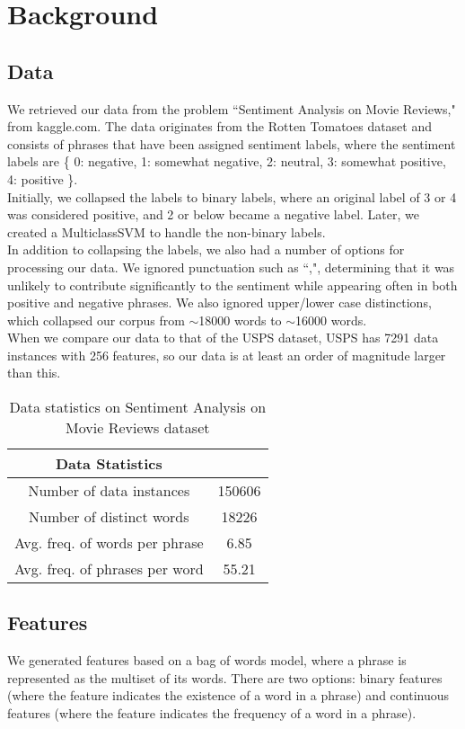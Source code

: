 \documentclass[letterpaper, 11pt]{article}
\begin{document}
\section{Background}

\subsection{Data}
We retrieved our data from the problem ``Sentiment Analysis on Movie Reviews," from kaggle.com.  The data originates from the Rotten Tomatoes dataset and consists of phrases that have been assigned sentiment labels, where the sentiment labels are \{ 0: negative, 1: somewhat negative, 2: neutral, 3: somewhat positive, 4: positive \}.\\
\indent Initially, we collapsed the labels to binary labels, where an original label of 3 or 4 was considered positive, and 2 or below became a negative label.  Later, we created a MulticlassSVM to handle the non-binary labels.  \\
\indent In addition to collapsing the labels, we also had a number of options for processing our data.  We ignored punctuation such as  ``,", determining that it was unlikely to contribute significantly to the sentiment while appearing often in both positive and negative phrases.  We also ignored upper/lower case distinctions, which collapsed our corpus from $\sim$18000 words to $\sim$16000 words.\\
\indent When we compare our data to that of the USPS dataset, USPS has 7291 data instances with 256 features, so our data is at least an order of magnitude larger than this.
\begin{table}
\centering
\label{stats}
\begin{tabular}{cc}
\textbf{Data Statistics}&\\
\hline
Number of data instances & 150606\\
Number of distinct words & 18226\\
Avg. freq. of words per phrase & 6.85\\
Avg. freq. of phrases per word & 55.21
\end{tabular}
\caption{Data statistics on Sentiment Analysis on Movie Reviews dataset}
\end{table}


\subsection{Features}
We generated features based on a bag of words model, where a phrase is represented as the multiset of its words.  There are two options: binary features (where the feature indicates the existence of a word in a phrase) and continuous features (where the feature indicates the frequency of a word in a phrase).
\end{document}
